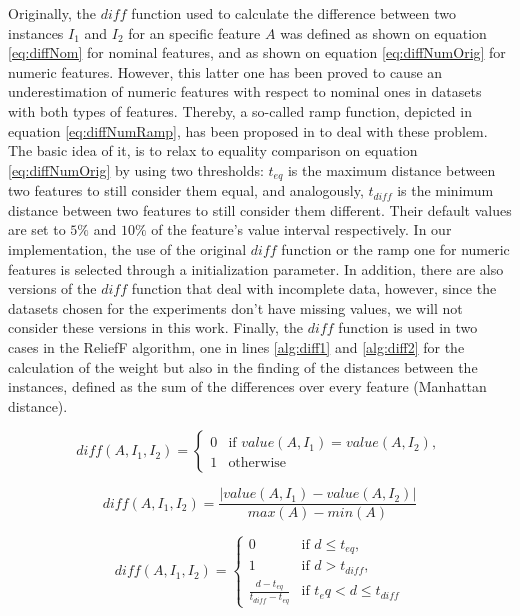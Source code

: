 Originally, the $diff$ function used to calculate the difference between two instances $I_1$ and $I_2$ for an specific feature $A$ was defined as shown on equation \ref{eq:diffNom} for nominal features, and as shown on equation \ref{eq:diffNumOrig} for numeric features. However, this latter one has been proved to cause an underestimation of numeric features with respect to nominal ones in datasets with both types of features. Thereby, a so-called ramp function, depicted in equation \ref{eq:diffNumRamp}, has been proposed in \cite{Hong1997} to deal with these problem. The basic idea of it, is to relax to equality comparison on equation \ref{eq:diffNumOrig} by using two thresholds: $t_{eq}$ is the maximum distance between two features to still consider them equal, and analogously, $t_{diff}$ is the minimum distance between two features to still consider them different. Their default values are set to $5\%$ and $10\%$ of the feature's value interval respectively. In our implementation, the use of the original $diff$ function or the ramp one for numeric features is selected through a initialization parameter. In addition, there are also versions of the $diff$ function that deal with incomplete data, however, since the datasets chosen for the experiments don't have missing values, we will not consider these versions in this work. Finally, the $diff$ function is used in two cases in the ReliefF algorithm, one in lines \ref{alg:diff1} and \ref{alg:diff2} for the calculation of the weight but also in the finding of the distances between the instances, defined as the sum of the differences over every feature (Manhattan distance).

\begin{equation}
\label{eq:diffNom}
diff(A,I_1,I_2) = \begin{cases}
0 & \text{if } value(A, I_1) = value(A, I_2),\\
1 & \text{otherwise }
\end{cases}
\end{equation}

\begin{equation}
\label{eq:diffNumOrig}
diff(A,I_1,I_2) = \frac{\left | value(A, I_1) - value(A, I_2) \right |}{ max(A) - min(A)}
\end{equation}

\begin{equation}
\label{eq:diffNumRamp}
diff(A,I_1,I_2) = \begin{cases}
0 & \text{if } d \leq t_{eq}, \\
1 & \text{if } d > t_{diff}, \\
\frac{d-t_{eq}}{t_{diff}-t_{eq}} & \text{if } t_eq < d \leq t_{diff}
\end{cases}
\end{equation}

